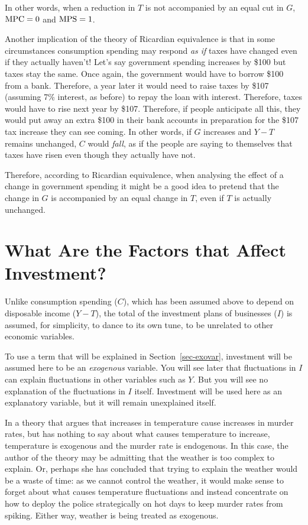 \documentclass[
  letterpaper,
]{book}
\theoremstyle{plain}
\theoremstyle{remark}
\begin{document}
In other words, when a reduction in \(T\) is not accompanied by an equal
cut in \(G\), \(\hbox{MPC}=0\) and \(\hbox{MPS}=1\).

Another implication of the theory of Ricardian equivalence is that in
some circumstances consumption spending may respond \emph{as if} taxes
have changed even if they actually haven't! Let's say government
spending increases by \$100 but taxes stay the same. Once again, the
government would have to borrow \$100 from a bank. Therefore, a year
later it would need to raise taxes by \$107 (assuming 7\% interest, as
before) to repay the loan with interest. Therefore, taxes would have to
rise next year by \$107. Therefore, if people anticipate all this, they
would put away an extra \$100 in their bank accounts in preparation for
the \$107 tax increase they can see coming. In other words, if \(G\)
increases and \(Y-T\) remains unchanged, \(C\) would \emph{fall}, as if
the people are saying to themselves that taxes have risen even though
they actually have not.

Therefore, according to Ricardian equivalence, when analysing the effect
of a change in government spending it might be a good idea to pretend
that the change in \(G\) is accompanied by an equal change in \(T\),
even if \(T\) is actually unchanged.

\section{What Are the Factors that Affect
Investment?}\label{sec-investment}

Unlike consumption spending (\(C\)), which has been assumed above to
depend on disposable income (\(Y-T\)), the total of the investment plans
of businesses (\(I\)) is assumed, for simplicity, to dance to its own
tune, to be unrelated to other economic variables.

To use a term that will be explained in Section~\ref{sec-exovar},
investment will be assumed here to be an \emph{exogenous} variable. You
will see later that fluctuations in \(I\) can explain fluctuations in
other variables such as \(Y\). But you will see no explanation of the
fluctuations in \(I\) itself. Investment will be used here as an
explanatory variable, but it will remain unexplained itself.

In a theory that argues that increases in temperature cause increases in
murder rates, but has nothing to say about what causes temperature to
increase, temperature is exogenous and the murder rate is endogenous. In
this case, the author of the theory may be admitting that the weather is
too complex to explain. Or, perhaps she has concluded that trying to
explain the weather would be a waste of time: as we cannot control the
weather, it would make sense to forget about what causes temperature
fluctuations and instead concentrate on how to deploy the police
strategically on hot days to keep murder rates from spiking. Either way,
weather is being treated as exogenous.
\end{document}
